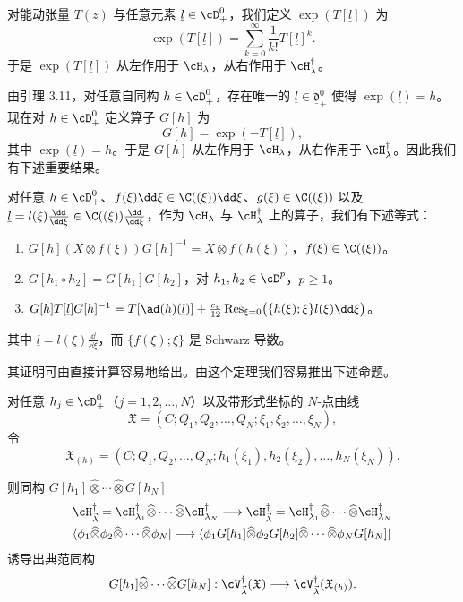 对能动张量 $T(z)$ 与任意元素 $\underline l\in\cD_+^{0}$，我们定义 $\exp(T[\underline l])$ 为
\[
\exp(T[\underline l])=\sum_{k=0}^{\infty}\frac{1}{k!}T[\underline l]^{k}.
\]
于是 $\exp(T[\underline l])$ 从左作用于 $\cH_{\lambda}$，从右作用于 $\cH_{\lambda}^{\dagger}$。

由引理 3.11，对任意自同构 $h\in\cD_+^{0}$，存在唯一的 $\underline l\in\underline{\mathfrak d}_+^{0}$ 使得 $\exp(\underline l)=h$。现在对 $h\in\cD_+^{0}$ 定义算子 $G[h]$ 为
\[
G[h]=\exp(-T[\underline l]),
\]
其中 $\exp(\underline l)=h$。于是 $G[h]$ 从左作用于 $\cH_{\lambda}$，从右作用于 $\cH_{\lambda}^{\dagger}$。因此我们有下述重要结果。

\begin{theorem}[3.12]
对任意 $h\in\cD_+^{0}$、$f(\xi)\dd\xi\in\C((\xi))\dd\xi$、$g(\xi)\in\C((\xi))$ 以及 $\underline l=l(\xi)\frac{\dd}{\dd\xi}\in\C((\xi))\frac{\dd}{\dd\xi}$，作为 $\cH_{\lambda}$ 与 $\cH_{\lambda}^{\dagger}$ 上的算子，我们有下述等式：
\begin{enumerate}
\item[(1)] $G[h](X\otimes f(\xi))G[h]^{-1}=X\otimes f(h(\xi))$，\quad $f(\xi)\in\C((\xi))$。
\item[(2)] $G[h_1\circ h_2]=G[h_1]G[h_2]$，\quad 对 $h_1,h_2\in\cD^{p}$，$p\ge1$。
\item[(3)] $G[h]T[\underline l]G[h]^{-1}=T[\ad(h)(\underline l)]+\frac{c_v}{12}\operatorname{Res}_{\xi=0}\bigl(\{h(\xi);\xi\}l(\xi)\dd\xi\bigr)$。
\end{enumerate}
其中 $\underline l=l(\xi)\frac{\dd}{\dd\xi}$，而 $\{f(\xi);\xi\}$ 是 Schwarz 导数。
\end{theorem}

其证明可由直接计算容易地给出。由这个定理我们容易推出下述命题。

\begin{proposition}[3.13]
对任意 $h_j\in\cD_+^{0}$（$j=1,2,\dots,N$）以及带形式坐标的 $N$-点曲线
\[
\mathfrak{X}=(C;Q_1,Q_2,\dots,Q_N;\xi_1,\xi_2,\dots,\xi_N),
\]
令
\[
\mathfrak{X}_{(h)}=(C;Q_1,Q_2,\dots,Q_N;h_1(\xi_1),h_2(\xi_2),\dots,h_N(\xi_N)).
\]

则同构 $G[h_1]\widehat{\otimes}\cdots\widehat{\otimes}G[h_N]$
\[
\begin{aligned}
&\cH_{\vec{\lambda}}^{\dagger}=\cH_{\lambda_1}^{\dagger}\widehat{\otimes}\cdots\widehat{\otimes}\cH_{\lambda_N}^{\dagger}
\longrightarrow\cH_{\vec{\lambda}}^{\dagger}=\cH_{\lambda_1}^{\dagger}\widehat{\otimes}\cdots\widehat{\otimes}\cH_{\lambda_N}^{\dagger}\\
&\langle\phi_1\widehat{\otimes}\phi_2\widehat{\otimes}\cdots\widehat{\otimes}\phi_N|
\longmapsto\langle\phi_1G[h_1]\widehat{\otimes}\phi_2G[h_2]\widehat{\otimes}\cdots\widehat{\otimes}\phi_NG[h_N]|
\end{aligned}
\]
诱导出典范同构
\[
G[h_1]\widehat{\otimes}\cdots\widehat{\otimes}G[h_N]:\cV_{\vec{\lambda}}^{\dagger}(\mathfrak{X})\longrightarrow\cV_{\vec{\lambda}}^{\dagger}(\mathfrak{X}_{(h)}).
\]
\end{proposition}

